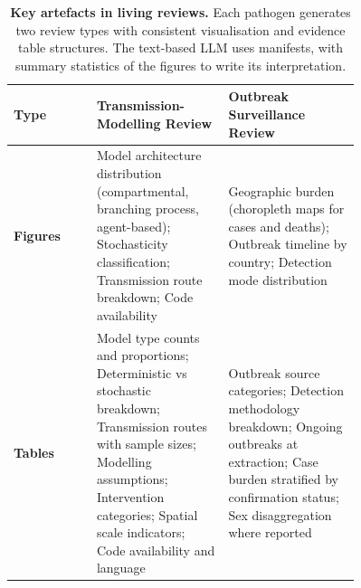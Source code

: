 \begin{table}[h]
\centering
\caption{\textbf{Key artefacts in \name{} living reviews.} Each pathogen generates two review types with consistent visualisation and evidence table structures. The text-based LLM  uses manifests, with summary statistics of the figures to write its interpretation.}
\label{tab:review_contents}
\small
\begin{tabular}{lp{0.38\linewidth}p{0.38\linewidth}}
\toprule
\textbf{Type} & \textbf{Transmission-Modelling Review} & \textbf{Outbreak Surveillance Review} \\
\midrule
\textbf{Figures} & 
Model architecture distribution (compartmental, branching process, agent-based); Stochasticity classification; Transmission route breakdown; Code availability 
& 
Geographic burden (choropleth maps for cases and deaths); Outbreak timeline by country; Detection mode distribution \\
\midrule
\textbf{Tables} & 
Model type counts and proportions; Deterministic vs stochastic breakdown; Transmission routes with sample sizes; Modelling assumptions; Intervention categories; Spatial scale indicators; Code availability and language 
& 
Outbreak source categories; Detection methodology breakdown; Ongoing outbreaks at extraction; Case burden stratified by confirmation status; Sex disaggregation where reported \\
\bottomrule
\end{tabular}
\end{table}

\clearpage
